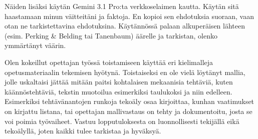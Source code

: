 \documentclass[finnish,utf8,nonumbib,palatino]{KokkolaRaportti}
\begin{document}
Näiden lisäksi käytän Gemini 3.1 Pro:ta verkkoselaimen kautta. Käytän sitä haastamaan minun väitteitäni ja faktoja. En kopioi sen ehdotuksia suoraan, vaan otan ne tarkistettavina ehdotuksina. Käytännössä palaan alkuperäisen lähteen (esim. Perking & Belding tai Tanenbaum) äärelle ja tarkistan, olenko ymmärtänyt väärin.

Olen kokeillut opettajan työssä toistamiseen käyttää eri kielimalleja opetusmateriaalin tekemisen hyötynä. Toistaiseksi en ole vielä löytänyt mallia, jolle uskaltaisi jättää mitään paitsi kohtalaisen mekaanisia tehtäviä, kuten käännöstehtäviä, tekstin muotoilua esimerkiksi taulukoksi ja niin edelleen. Esimerkiksi tehtävänantojen runkoja tekoäly osaa kirjoittaa, kunhan vaatimukset on kirjattu listana, tai opettajan mallivastaus on tehty ja dokumentoitu, josta se voi poimia työvaiheet. Vastuu lopputuloksesta on luonnollisesti tekijällä eikä tekoälyllä, joten kaikki tulee tarkistaa ja hyväksyä.


\end{document}
